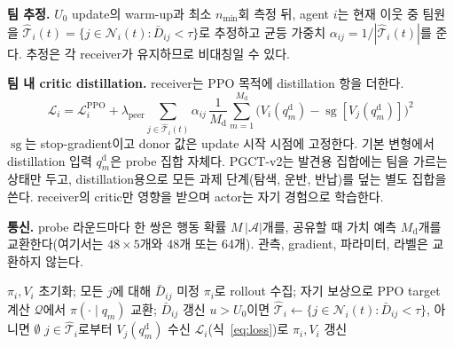 \documentclass[twocolumn,10pt]{article}
\newcommand{\sg}{\operatorname{sg}}
\newcommand{\ours}{PGCT}
\begin{document}
\textbf{팀 추정.} $U_0$ update의 warm-up과 최소 $n_{\min}$회 측정 뒤, agent $i$는 현재 이웃 중 팀원을 $\hat{\mathcal{T}}_i(t)=\{j\in\mathcal{N}_i(t): \bar D_{ij}<\tau\}$로
추정하고 균등 가중치 $\alpha_{ij}=1/|\hat{\mathcal{T}}_i(t)|$를 준다. 추정은 각 receiver가 유지하므로 비대칭일 수 있다.

\textbf{팀 내 critic distillation.} receiver는 PPO 목적에 distillation 항을 더한다.
\begin{equation}
  \mathcal{L}_i = \mathcal{L}^{\mathrm{PPO}}_i + \lambda_{\mathrm{peer}} \sum_{j\in\hat{\mathcal{T}}_i(t)} \alpha_{ij}\,
  \frac{1}{M_{\mathrm{d}}}\sum_{m=1}^{M_{\mathrm{d}}}\big(V_i(q^{\mathrm{d}}_m) - \sg[V_j(q^{\mathrm{d}}_m)]\big)^2
  \label{eq:loss}
\end{equation}
$\sg$는 stop-gradient이고 donor 값은 update 시작 시점에 고정한다. 기본 변형에서 distillation 입력 $q^{\mathrm{d}}_m$은 probe 집합 자체다. \ours{}-v2는 발견용 집합에는
팀을 가르는 상태만 두고, distillation용으로 모든 과제 단계(탐색, 운반, 반납)를 덮는 별도 집합을 쓴다. receiver의 critic만 영향을 받으며 actor는 자기 경험으로 학습한다.

\textbf{통신.} probe 라운드마다 한 쌍은 행동 확률 $M\,|\mathcal{A}|$개를, 공유할 때 가치 예측 $M_{\mathrm{d}}$개를 교환한다(여기서는 $48\times5$개와 48개 또는 64개).
관측, gradient, 파라미터, 라벨은 교환하지 않는다.

\begin{algorithm}[t]
\caption{agent $i$의 \ours{}}
\label{alg:pgct}
\begin{algorithmic}[1]
\State $\pi_i, V_i$ 초기화; 모든 $j$에 대해 $\bar D_{ij}$ 미정
  \State $\pi_i$로 rollout 수집; 자기 보상으로 PPO target 계산
      \State $\mathcal{Q}$에서 $\pi(\cdot\mid q_m)$ 교환; $\bar D_{ij}$ 갱신
    \EndFor
  \EndIf
  \State $u>U_0$이면 $\hat{\mathcal{T}}_i\gets\{j\in\mathcal{N}_i(t): \bar D_{ij}<\tau\}$, 아니면 $\emptyset$
  \State $j\in\hat{\mathcal{T}}_i$로부터 $V_j(q^{\mathrm{d}}_m)$ 수신
  \State $\mathcal{L}_i$(식~\ref{eq:loss})로 $\pi_i, V_i$ 갱신
\EndFor
\end{algorithmic}
\end{algorithm}
\end{document}
